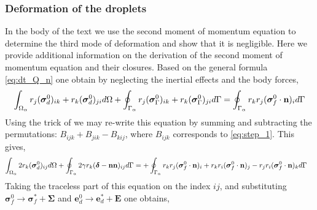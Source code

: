 \subsubsection*{Deformation of the droplets}

In the body of the text we use the second moment of momentum equation to determine the third mode of deformation and show that it is negligible. 
Here we provide additional information on the derivation of the second moment of momentum equation and their closures. 
Based on the general formula \ref{eq:dt_Q_n} one obtain by neglecting the inertial effects  and the body forces,  
\begin{equation}
    \intO{ r_{j}(\bm{\sigma}^0_d)_{ik}+r_{k}(\bm{\sigma}^0_d)_{ji}}
    +\intS{ r_{j}(\bm{\sigma}^0_\Gamma)_{ik}+r_{k}(\bm{\sigma}_\Gamma^0)_{ji}}
    = 
    \intS{  r_{k}r_{j} (\bm{\sigma}_f^0\cdot\textbf{n})_i }
    \label{eq:step_1}
\end{equation}
Using the trick of \citet{lhuillier1996contribution} we may re-write this equation by summing and subtracting the permutations:  $B_{ijk} + B_{jik} - B_{kij}$, where $B_{ijk}$ corresponds to \ref{eq:step_1}. 
This gives, 
\begin{align}
    \int_{\Omega_{\alpha}} 2 r_{k}(\bm{\sigma}^0_d)_{ij} d\Omega
    +\oint_{\Gamma_{\alpha}} 2\gamma r_{k}(\bm\delta - \textbf{nn})_{ij} d\Gamma
    &= 
    +\oint_{\Gamma_{\alpha}} 
        r_{k}r_{j} (\bm{\sigma}_f^0\cdot\textbf{n})_i 
        + r_{k}r_{i} (\bm{\sigma}_f^0\cdot\textbf{n})_j 
        - r_{j}r_{i} (\bm{\sigma}_f^0\cdot\textbf{n})_k 
     d\Gamma
\end{align}
Taking the traceless part of this equation on the index $ij$, and substituting $\bm\sigma_f^0 \to \bm\sigma_f^* + \bm\Sigma$ and $\textbf{e}_d^0 \to \textbf{e}_d^* + \textbf{E}$ one obtains, 
